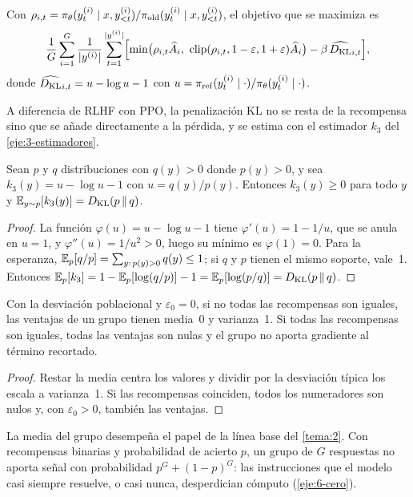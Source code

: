 \begin{definicion}\label{def:grpo}
Con $\rho_{i,t}=\pi_\theta(y^{(i)}_t\mid x,y^{(i)}_{<t})/\pi_{\mathrm{old}}(y^{(i)}_t\mid x,y^{(i)}_{<t})$, el objetivo que se maximiza es~\cite[ec.~(3)]{deepseekmath}
\[
\frac1G\sum_{i=1}^{G}\frac{1}{\lvert y^{(i)}\rvert}\sum_{t=1}^{\lvert y^{(i)}\rvert}\Bigl[\min\bigl(\rho_{i,t}\widehat A_i,\ \operatorname{clip}(\rho_{i,t},1-\varepsilon,1+\varepsilon)\widehat A_i\bigr)-\beta\,\widehat{D_{\mathrm{KL}}}_{i,t}\Bigr],
\]
donde $\widehat{D_{\mathrm{KL}}}_{i,t}=u-\log u-1$ con $u=\pi_{\mathrm{ref}}(y^{(i)}_t\mid\cdot)/\pi_\theta(y^{(i)}_t\mid\cdot)$.
\end{definicion}

A diferencia de RLHF con PPO, la penalización KL no se resta de la recompensa sino que se añade directamente a la pérdida, y se estima con el estimador $k_3$ del \cref{eje:3-estimadores}.

\begin{proposicion}\label{prop:k3}
Sean $p$ y $q$ distribuciones con $q(y)>0$ donde $p(y)>0$, y sea $k_3(y)=u-\log u-1$ con $u=q(y)/p(y)$. Entonces $k_3(y)\ge 0$ para todo $y$ y $\mathbb{E}_{y\sim p}[k_3(y)]=D_{\mathrm{KL}}(p\,\|\,q)$.
\end{proposicion}

\begin{proof}
La función $\varphi(u)=u-\log u-1$ tiene $\varphi'(u)=1-1/u$, que se anula en $u=1$, y $\varphi''(u)=1/u^{2}>0$, luego su mínimo es $\varphi(1)=0$. Para la esperanza, $\mathbb{E}_p[q/p]=\sum_{y:\,p(y)>0}q(y)\le 1$; si $q$ y $p$ tienen el mismo soporte, vale~1. Entonces $\mathbb{E}_p[k_3]=1-\mathbb{E}_p[\log(q/p)]-1=\mathbb{E}_p[\log(p/q)]=D_{\mathrm{KL}}(p\,\|\,q)$.
\end{proof}

\begin{proposicion}\label{prop:grpo}
Con la desviación poblacional y $\varepsilon_0=0$, si no todas las recompensas son iguales, las ventajas de un grupo tienen media~0 y varianza~1. Si todas las recompensas son iguales, todas las ventajas son nulas y el grupo no aporta gradiente al término recortado.
\end{proposicion}

\begin{proof}
Restar la media centra los valores y dividir por la desviación típica los escala a varianza~1. Si las recompensas coinciden, todos los numeradores son nulos y, con $\varepsilon_0>0$, también las ventajas.
\end{proof}

La media del grupo desempeña el papel de la línea base del \cref{tema:2}. Con recompensas binarias y probabilidad de acierto $p$, un grupo de $G$ respuestas no aporta señal con probabilidad $p^{G}+(1-p)^{G}$: las instrucciones que el modelo casi siempre resuelve, o casi nunca, desperdician cómputo (\cref{eje:6-cero}).

